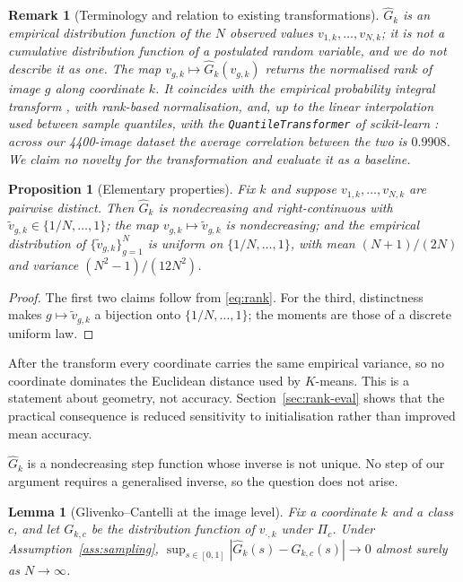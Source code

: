 \documentclass[pdflatex,sn-basic]{sn-jnl}
\theoremstyle{thmstyleone}%
\newtheorem{proposition}[theorem]{Proposition}%
\newtheorem{lemma}[theorem]{Lemma}%
\theoremstyle{thmstyletwo}%
\newtheorem{remark}{Remark}%
\theoremstyle{thmstylethree}%
\begin{document}
\begin{remark}[Terminology and relation to existing
transformations]\label{rem:pit}
$\widehat{G}_k$ is an empirical distribution function of the $N$ observed
values $v_{1,k},\dots,v_{N,k}$; it is not a cumulative distribution function of
a postulated random variable, and we do not describe it as one. The map
$v_{g,k}\mapsto\widehat{G}_k(v_{g,k})$ returns the normalised rank of image $g$
along coordinate $k$. It coincides with the empirical probability integral
transform \cite{ref:rosenblatt1952}, with rank-based normalisation, and, up to
the linear interpolation used between sample quantiles, with the
\texttt{QuantileTransformer} of scikit-learn \cite{ref:pedregosa2011}: across
our 4400-image dataset the average correlation between the two is $0.9908$. We
claim no novelty for the transformation and evaluate it as a baseline.
\end{remark}

\begin{proposition}[Elementary properties]\label{prop:properties}
Fix $k$ and suppose $v_{1,k},\dots,v_{N,k}$ are pairwise distinct. Then
$\widehat{G}_k$ is nondecreasing and right-continuous with
$\widetilde{v}_{g,k}\in\{1/N,\dots,1\}$; the map
$v_{g,k}\mapsto\widetilde{v}_{g,k}$ is nondecreasing; and the empirical
distribution of $\{\widetilde{v}_{g,k}\}_{g=1}^{N}$ is uniform on
$\{1/N,\dots,1\}$, with mean $(N+1)/(2N)$ and variance $(N^2-1)/(12N^2)$.
\end{proposition}

\begin{proof}
The first two claims follow from \eqref{eq:rank}. For the third, distinctness
makes $g\mapsto\widetilde{v}_{g,k}$ a bijection onto $\{1/N,\dots,1\}$; the
moments are those of a discrete uniform law.
\end{proof}

After the transform every coordinate carries the same empirical variance, so no
coordinate dominates the Euclidean distance used by $K$-means. This is a
statement about geometry, not accuracy. Section~\ref{sec:rank-eval} shows that
the practical consequence is reduced sensitivity to initialisation rather than
improved mean accuracy.

$\widehat{G}_k$ is a nondecreasing step function whose inverse is not unique.
No step of our argument requires a generalised inverse, so the question does
not arise.

\begin{lemma}[Glivenko--Cantelli at the image level]\label{lemma:gc}
Fix a coordinate $k$ and a class $c$, and let $G_{k,c}$ be the distribution
function of $v_{\cdot,k}$ under $\Pi_c$. Under Assumption~\ref{ass:sampling},
$\sup_{s\in[0,1]}|\widehat{G}_{k}(s)-G_{k,c}(s)|\to0$ almost surely as
$N\to\infty$.
\end{lemma}
\end{document}
